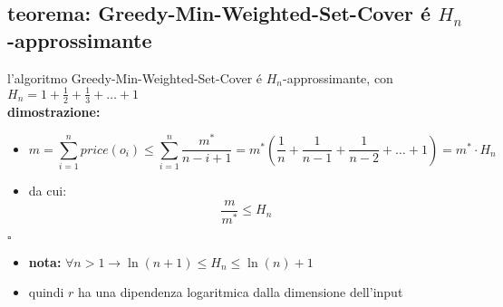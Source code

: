 
\subsection*{teorema: Greedy-Min-Weighted-Set-Cover \'e $H_n$-approssimante}
\begin{flushleft}
	l'algoritmo Greedy-Min-Weighted-Set-Cover \'e $H_n$-approssimante, con
	$H_n=1+\frac{1}{2}+\frac{1}{3}+\ldots+1$ \newline \\
	\textbf{dimostrazione:}
	\begin{itemize}
		\item[] $$m=\sum_{i=1}^nprice(o_i)\leq\sum_{i=1}^n\frac{m^*}{n-i+1}=m^*(\frac{1}{n}+\frac{1}{n-1}+\frac{1}{n-2}+\ldots+1)=m^*\cdot H_n$$
		\item da cui:
			$$\frac{m}{m^*}\leq H_n$$
	\end{itemize}
	\hfill$\square$
	\begin{itemize}
		\item \textbf{nota:} $\forall n>1\rightarrow \ln(n+1)\leq H_n\leq\ln(n)+1$
		\item quindi $r$ ha una dipendenza logaritmica dalla dimensione dell'input
	\end{itemize}
\end{flushleft}


